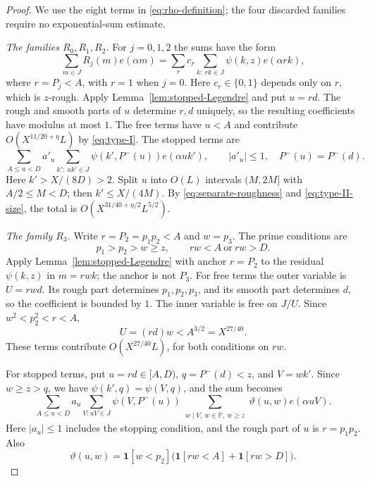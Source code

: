 \documentclass{amsart}
\numberwithin{equation}{section}
\numberwithin{table}{section}
\newcommand{\PP}{\mathbb P}
\newcommand{\ind}{\mathbf 1}
\begin{document}
\begin{proof}
We use the eight terms in \eqref{eq:rho-definition}; the four discarded
families require no exponential-sum estimate.

\noindent\textit{The families $R_0,R_1,R_2$.}
For $j=0,1,2$ the sums have the form
\begin{equation*}
\sum_{m\in J}R_j(m)e(\alpha m)
=\sum_r c_r\sum_{k:\ rk\in J}\psi(k,z)e(\alpha rk),
\end{equation*}
where $r=P_j<A$, with $r=1$ when $j=0$.
Here $c_r\in\{0,1\}$ depends only on $r$, which is $z$-rough.
Apply Lemma~\ref{lem:stopped-Legendre} and put $u=rd$. The rough and
smooth parts of $u$ determine $r,d$ uniquely, so the resulting
coefficients have modulus at most $1$. The free terms have $u<A$ and
contribute
$O(X^{11/20+\eta}L)$ by \eqref{eq:type-I}.
The stopped terms are
\[
\sum_{A\le u<D}a'_u\sum_{k':\ uk'\in J}
\psi(k',P^-(u))e(\alpha uk'),
\qquad |a'_u|\le1,\quad P^-(u)=P^-(d).
\]
Here $k'>X/(8D)>2$. Split $u$ into $O(L)$ intervals $(M,2M]$ with
$A/2\le M<D$; then $k'\le X/(4M)$.
By \eqref{eq:separate-roughness} and \eqref{eq:type-II-size}, the total is
$O(X^{31/40+\eta/2}L^{5/2})$.

\noindent\textit{The family $R_3$.}
Write $r=P_2=p_1p_2<A$ and $w=p_3$. The prime conditions are
\[
p_1>p_2>w\ge z,\qquad rw<A\ \text{or}\ rw>D.
\]
Apply Lemma~\ref{lem:stopped-Legendre} with anchor $r=P_2$ to the
residual $\psi(k,z)$ in $m=rwk$; the anchor is not $P_3$.
For free terms the outer variable is $U=rwd$. Its rough part determines
$p_1,p_2,p_3$, and its smooth part determines $d$, so the coefficient is
bounded by $1$. The inner variable is free on $J/U$.
Since $w^2<p_2^2<r<A$,
\[
U=(rd)w<A^{3/2}=X^{27/40}.
\]
These terms contribute $O(X^{27/40}L)$, for both conditions on $rw$.

For stopped terms, put $u=rd\in[A,D)$, $q=P^-(d)<z$, and $V=wk'$.
Since $w\ge z>q$, we have $\psi(k',q)=\psi(V,q)$, and the sum becomes
\begin{equation}\label{eq:R3-stopped}
\sum_{A\le u<D}a_u\sum_{V:uV\in J}
\psi(V,P^-(u))
\sum_{\substack{w\mid V,\ w\in\PP,\ w\ge z}}
\vartheta(u,w)e(\alpha uV).
\end{equation}
Here $|a_u|\le1$ includes the stopping condition, and the rough part of
$u$ is $r=p_1p_2$. Also
\[
\vartheta(u,w)=\ind[w<p_2]
\bigl(\ind[rw<A]+\ind[rw>D]\bigr).
\]


\end{proof}
\end{document}
